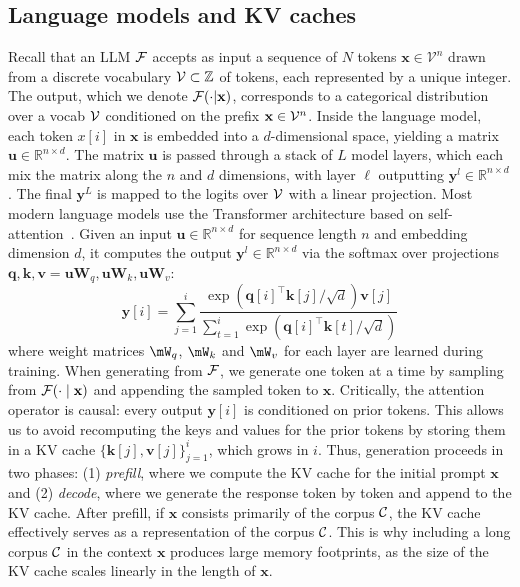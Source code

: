 \subsection{Language models and KV caches}
\label{sec:lm-background}
Recall that an LLM $\mathcal{F}$ accepts as input a sequence of $N$ tokens $\mathbf{x} \in \mathcal{V}^n$  drawn from a discrete vocabulary $\mathcal{V} \subset \mathbb{Z}$ of tokens, each represented by a unique integer.
The output, which we denote $\mathcal{F}(\cdot | \mathbf{x})$, corresponds to a categorical distribution over a vocab $\mathcal{V}$ conditioned on the prefix  $\mathbf{x} \in \mathcal{V}^n$.
Inside the language model, each token $x[i]$ in $\mathbf{x}$ is embedded into a $d$-dimensional space, yielding a matrix $\mathbf{u} \in \mathbb{R}^{n\times d}$.
The matrix $\mathbf{u}$ is passed through a stack of $L$ model layers, which each mix the matrix along the $n$ and $d$ dimensions, with layer $\ell$ outputting $\mathbf{y}^l \in \mathbb{R}^{n\times d}$.
The final $\mathbf{y}^L$ is mapped to the logits over $\mathcal{V}$ with a linear projection.
Most modern language models use the Transformer architecture based on self-attention~\cite{vaswani2017attention}. Given an input $\mathbf{u} \in \mathbb{R}^{n\times d}$ for sequence length $n$ and embedding dimension $d$, it computes the output $\mathbf{y}^l \in \mathbb{R}^{n \times d}$ via the softmax over projections
\(
\mathbf{q}, \mathbf{k}, \mathbf{v} = \mathbf{u} \mathbf{W}_q, \mathbf{u} \mathbf{W}_k, \mathbf{u} \mathbf{W}_v
\):
\begin{equation}
\mathbf{y}[i] = \sum_{j=1}^i\frac{\exp(\mathbf{q}[i]^\top \mathbf{k}[j] /\sqrt{d}) \mathbf{v}[j] }{\sum_{t = 1}^{i} \exp(\mathbf{q}[i]^\top \mathbf{k}[t] /\sqrt{d})}
\label{eq:softmax_attention}
\end{equation}
where weight matrices $\mW_q$, $\mW_k$ and $\mW_v$ for each layer are learned during training.
When generating from $\mathcal{F}$, we generate one token at a time by sampling from $\mathcal{F}(\cdot \mid \mathbf{x})$ and appending the sampled token to $\mathbf{x}$.
Critically, the attention operator is causal: every output $\mathbf{y}[i]$ is conditioned on prior tokens.
This allows us to avoid recomputing the keys and values for the prior tokens by storing them in a KV cache $\{\mathbf{k}[j], \mathbf{v}[j]\}_{j=1}^{i}$, which grows in $i$.
Thus, generation proceeds in two phases: (1) \textit{prefill}, where we compute the KV cache for the initial prompt $\mathbf{x}$ and (2) \textit{decode}, where we generate the response token by token and append to the KV cache.
After prefill, if $\mathbf{x}$ consists primarily of the corpus $\mathcal{C}$, the KV cache effectively serves as a representation of the corpus $\mathcal{C}$.
This is why including a long corpus $\mathcal{C}$ in the context $\mathbf{x}$ produces large memory footprints, as the size of the KV cache scales linearly in the length of $\mathbf{x}$.
